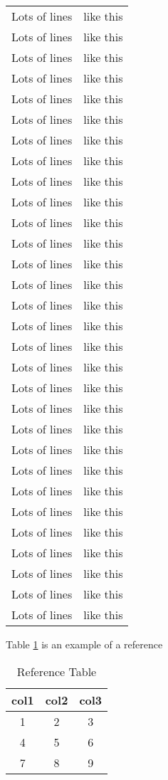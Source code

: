 \documentclass{report}
\begin{document}
\begin{longtable}[c]{| c | c |}
 Lots of lines & like this\\
 Lots of lines & like this\\
 Lots of lines & like this\\
 Lots of lines & like this\\
 Lots of lines & like this\\
 Lots of lines & like this\\
 Lots of lines & like this\\
 Lots of lines & like this\\
 Lots of lines & like this\\
 Lots of lines & like this\\
 Lots of lines & like this\\
 Lots of lines & like this\\
 Lots of lines & like this\\
 Lots of lines & like this\\
 Lots of lines & like this\\
 Lots of lines & like this\\
 Lots of lines & like this\\
 Lots of lines & like this\\
 Lots of lines & like this\\
 Lots of lines & like this\\
 Lots of lines & like this\\
 Lots of lines & like this\\
 Lots of lines & like this\\
 Lots of lines & like this\\
 Lots of lines & like this\\
 Lots of lines & like this\\
 Lots of lines & like this\\
 Lots of lines & like this\\
 Lots of lines & like this\\
 Lots of lines & like this\\
 \end{longtable}
\listoftables
\vspace{10 pt}
Table \ref{tab:my_label} is an example of a reference
\begin{table}[h!]
    \centering
    \begin{tabular}{|c|c|c|}
        \hline
        col1 & col2 & col3  \\
        \hline
        1 & 2 & 3 \\
        4 & 5 & 6 \\
        7 & 8 & 9 \\
        \hline
    \end{tabular}
    \caption{Reference Table}
    \label{tab:my_label}
\end{table}
\end{document}
